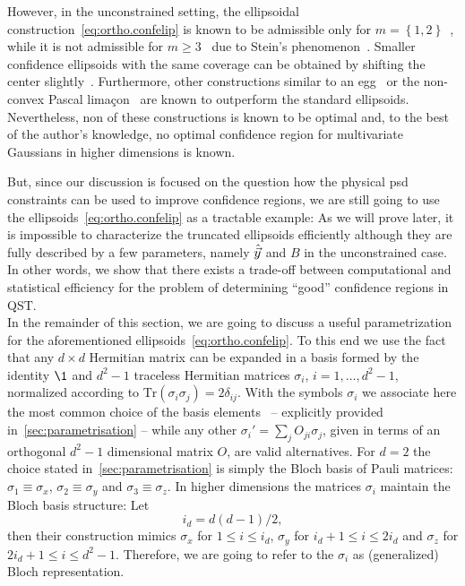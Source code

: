 However, in the unconstrained setting, the ellipsoidal construction~\eqref{eq:ortho.confelip} is known to be admissible only for $m=\left\{ 1,2\right\}$~\cite{Joshi_1969_Admissibility}, while it is not admissible for $m\geq3$~\cite{Joshi_1967_Inadmissibility} due to Stein's phenomenon~\cite{Stein_1956_Inadmissibility}.
Smaller confidence ellipsoids with the same coverage can be obtained by shifting the center slightly~\cite{Tseng_1997_Good,Hwang_1982_Minimax}.
Furthermore, other constructions similar to an egg~\cite{Shinozaki_????_Improved} or the non-convex Pascal lima\c{c}on~\cite{Brown_1995_Optimal} are known to outperform the standard ellipsoids.
Nevertheless, non of these constructions is known to be optimal and, to the best of the author's knowledge, no optimal confidence region for multivariate Gaussians in higher dimensions is known.

But, since our discussion is focused on the question how the physical psd constraints can be used to improve confidence regions, we are still going to use the ellipsoids~\eqref{eq:ortho.confelip} as a tractable example:
As we will prove later, it is impossible to characterize the truncated ellipsoids efficiently although they are fully described by a few parameters, namely $\hat{\vec y}$ and $B$ in the unconstrained case.
In other words, we show that there exists a trade-off between computational and statistical efficiency for the problem of determining ``good'' confidence regions in QST.\\



In the remainder of this section, we are going to discuss a useful parametrization for the aforementioned ellipsoids~\eqref{eq:ortho.confelip}.
To this end we use the fact that any $d\times d$ Hermitian matrix can be expanded in a basis formed by the identity $\1$ and $d^{2}-1$ traceless Hermitian matrices $\sigma_{i}$, $i=1,\ldots,d^{2}-1$, normalized according to $\textrm{Tr}(\sigma_{i}\sigma_{j})=2\delta_{ij}$.
With the symbols $\sigma_{i}$ we associate here the most common choice of the basis elements~\cite{Kimura_2003_Bloch}  --  explicitly provided in~\ref{sec:parametrisation} -- while any other $\sigma_{i}'=\sum_{j}O_{ji}\sigma_{j}$, given in terms of an orthogonal $d^{2}-1$ dimensional matrix $O$, are valid alternatives.
For $d=2$ the choice stated in~\ref{sec:parametrisation} is simply the Bloch basis of Pauli matrices: $\sigma_{1}\equiv\sigma_{x}$, $\sigma_{2}\equiv\sigma_{y}$ and $\sigma_{3}\equiv\sigma_{z}$.
In higher dimensions the matrices $\sigma_{i}$ maintain the Bloch basis structure:
Let
\begin{equation}
  \label{eq:ortho.x_yz_index}
  i_{d}=d(d-1)/2,
\end{equation}
then their construction mimics $\sigma_{x}$ for $1\leq i\leq i_{d}$, $\sigma_{y}$ for $i_{d}+1\leq i\leq2i_{d}$ and $\sigma_{z}$ for $2i_{d}+1\leq i\leq d^{2}-1$.
Therefore, we are going to refer to the $\sigma_{i}$ as (generalized) Bloch representation.

